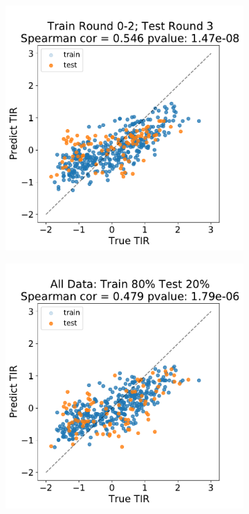 \documentclass{scrartcl}[2013/05/29]%
\begin{document}
\begin{figure}[!ht]
\begin{subfigure}[b]{0.49\textwidth}
    \end{subfigure}
    \begin{subfigure}[b]{0.49\textwidth}
        \centering
        \caption{}
        \includegraphics[scale=0.4]{plots/Main_Paper/scatter_abc1_FF_2.pdf}
    \end{subfigure}
    \begin{subfigure}[b]{0.49\textwidth}
        \centering
        \caption{}
        \includegraphics[scale=0.4]{plots/Main_Paper/scatter_abc1_FF_3.pdf}

\end{subfigure}
\end{figure}
\end{document}
